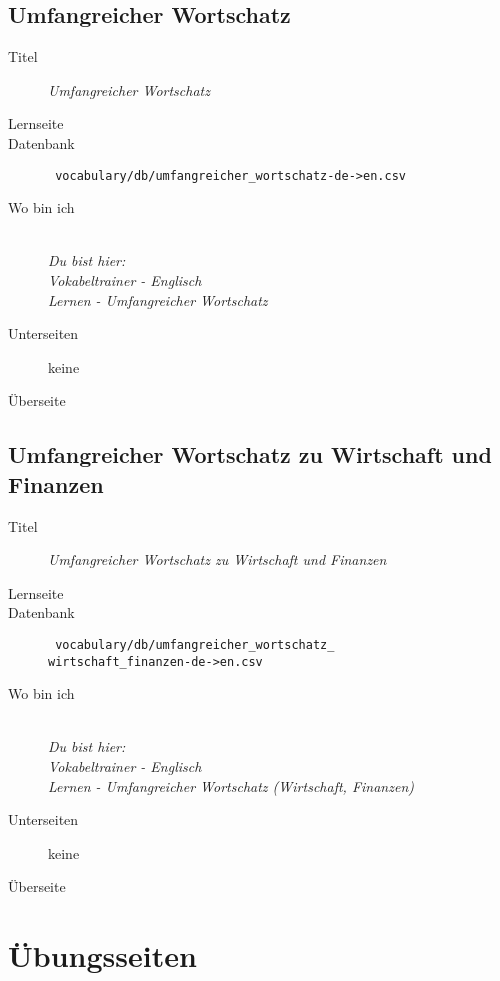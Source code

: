 \subsection{ Umfangreicher Wortschatz }
\label{has:voc-learn-page4}
\begin{description}
	\item[Titel] \emph{ Umfangreicher Wortschatz }
	\item[Lernseite] 
	\item[Datenbank] \texttt{ vocabulary/db/umfangreicher\_wortschatz-de->en.csv }
	\item[Wo bin ich] \emph{\\Du bist hier:\\Vokabeltrainer - Englisch\\Lernen - Umfangreicher Wortschatz}
	\item[Unterseiten] keine
	\item[Überseite] 
\end{description}

\subsection{ Umfangreicher Wortschatz zu Wirtschaft und Finanzen }
\label{has:voc-learn-page5}
\begin{description}
	\item[Titel] \emph{ Umfangreicher Wortschatz zu Wirtschaft und Finanzen }
	\item[Lernseite] 
	\item[Datenbank] \texttt{ vocabulary/db/umfangreicher\_wortschatz\_\\wirtschaft\_finanzen-de->en.csv }
	\item[Wo bin ich] \emph{\\Du bist hier:\\Vokabeltrainer - Englisch\\Lernen - Umfangreicher Wortschatz (Wirtschaft, Finanzen)}
	\item[Unterseiten] keine
	\item[Überseite] 
\end{description}

\section{ Übungsseiten }
\label{has:voc-practice}

